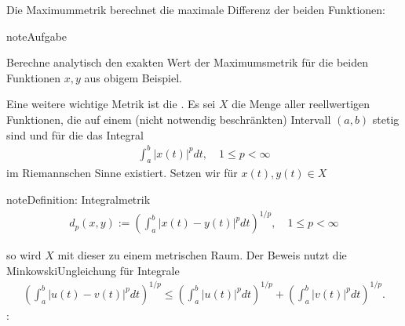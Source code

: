\documentclass[letterpaper,10pt,english]{jupyterBook}
\begin{document}
\noindent{}

Die Maximummetrik berechnet die maximale Differenz der beiden Funktionen:

\begin{sphinxVerbatim}[commandchars=\\\{\}]
 
\end{sphinxVerbatim}

\noindent{}

\begin{sphinxadmonition}{note}{Aufgabe}

Berechne analytisch den exakten Wert der Maximumsmetrik für die beiden Funktionen \(x,y\) aus obigem Beispiel.
\end{sphinxadmonition}

Eine weitere wichtige Metrik ist die . Es sei \(X\) die Menge aller reellwertigen Funktionen, die auf einem (nicht notwendig beschränkten) Intervall \((a,b)\) stetig sind und für die das Integral
\begin{equation*}
\begin{split}\int_a^b |x(t)|^p dt, \quad 1\le p < \infty\end{split}
\end{equation*}
im Riemannschen Sinne existiert. Setzen wir für \(x(t), y(t)\in X\)

\begin{sphinxadmonition}{note}{Definition: Integralmetrik}
\begin{equation*}
\begin{split}d_p(x,y) := \left(\int_a^b |x(t)-y(t)|^p dt\right)^{1/p},\quad 1\le p < \infty\end{split}
\end{equation*}\end{sphinxadmonition}

so wird \(X\) mit dieser  zu einem metrischen Raum. Der Beweis nutzt die Minkowski\sphinxhyphen{}Ungleichung für Integrale
\begin{equation*}
\begin{split}\left(\int_a^b |u(t)-v(t)|^p dt\right)^{1/p} \le \left(\int_a^b |u(t)|^p dt\right)^{1/p} + \left(\int_a^b |v(t)|^p dt\right)^{1/p}.\end{split}
\end{equation*}
:
\end{document}
